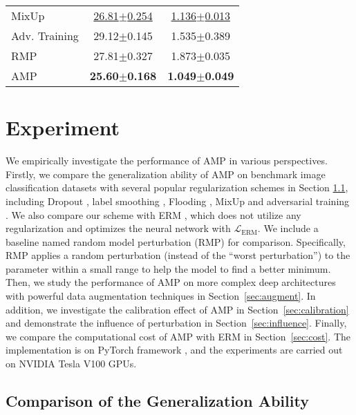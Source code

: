 \documentclass[final]{cvpr}
\begin{document}
\begin{table*}[t]
{{\begin{tabular}{lcc}
MixUp & \underline{26.81$\pm$0.254} & \underline{1.136$\pm$0.013} \\
Adv. Training & 29.12$\pm$0.145 & 1.535$\pm$0.389 \\
RMP & 27.81$\pm$0.327 & 1.873$\pm$0.035 \\
AMP & \textbf{25.60$\pm$0.168} & \textbf{1.049$\pm$0.049} \\
\bottomrule
\end{tabular}
}}\caption{Top-1 classification errors and test neg-log-likelihoods on (a) SVHN, (b) CIFAR-10 and (c) CIFAR-100. We run experiments 10 times to report the mean and the standard deviation of errors and neg-log-likelihoods.}
\label{tab:cvresults}
\end{table*}

\section{Experiment}

We empirically investigate the performance of AMP in various perspectives. Firstly, we compare the generalization ability of AMP on benchmark image classification datasets with several popular regularization schemes in Section \ref{sec:compare}, including Dropout \cite{srivastava2014dropout}, label smoothing \cite{szegedy2016rethinking}, Flooding \cite{ishida2020we}, MixUp \cite{zhang2018mixup} and adversarial training \cite{goodfellow2015explaining}. We also compare our scheme with ERM \cite{vapnik1998statistical}, which does not utilize any regularization and optimizes the neural network with $\mathcal{L}_\mathrm{ERM}$. We include a baseline named random model perturbation (RMP) for comparison. Specifically, RMP applies a random perturbation (instead of the ``worst perturbation'') to the parameter within a small range to help the model to find a better minimum. Then, we study the performance of AMP on more complex deep architectures with powerful data augmentation techniques in Section~\ref{sec:augment}. In addition, we investigate the calibration effect of AMP in Section~\ref{sec:calibration} and demonstrate the influence of perturbation in Section~\ref{sec:influence}. Finally, we compare the computational cost of AMP with ERM in Section~\ref{sec:cost}. The implementation is on PyTorch framework \cite{paszke2019pytorch}, and the experiments are carried out on NVIDIA Tesla V100 GPUs.

\subsection{Comparison of the Generalization Ability}\label{sec:compare}
\end{document}
